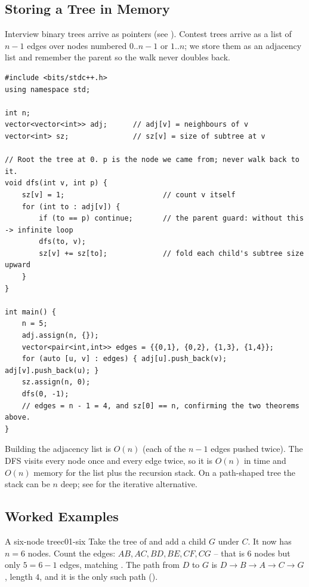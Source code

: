 \subsection{Storing a Tree in Memory}

Interview binary trees arrive as  pointers (see ). Contest
trees arrive as a list of $n-1$ edges over nodes numbered $0..n-1$ or $1..n$; we store
them as an adjacency list and remember the parent so the walk never doubles back.

\begin{lstlisting}[caption={Build an adjacency list from edges and measure sizes with a parent-guard DFS}, label={lst:c01-build}]
#include <bits/stdc++.h>
using namespace std;

int n;
vector<vector<int>> adj;      // adj[v] = neighbours of v
vector<int> sz;               // sz[v] = size of subtree at v

// Root the tree at 0. p is the node we came from; never walk back to it.
void dfs(int v, int p) {
    sz[v] = 1;                       // count v itself
    for (int to : adj[v]) {
        if (to == p) continue;       // the parent guard: without this -> infinite loop
        dfs(to, v);
        sz[v] += sz[to];             // fold each child's subtree size upward
    }
}

int main() {
    n = 5;
    adj.assign(n, {});
    vector<pair<int,int>> edges = {{0,1}, {0,2}, {1,3}, {1,4}};
    for (auto [u, v] : edges) { adj[u].push_back(v); adj[v].push_back(u); }
    sz.assign(n, 0);
    dfs(0, -1);
    // edges = n - 1 = 4, and sz[0] == n, confirming the two theorems above.
}
\end{lstlisting}

\begin{complexitybox}
Building the adjacency list is $O(n)$ (each of the $n-1$ edges pushed twice). The DFS
visits every node once and every edge twice, so it is $O(n)$ in time and $O(n)$ memory
for the list plus the recursion stack. On a path-shaped tree the stack can be $n$ deep;
see  for the iterative alternative.
\end{complexitybox}

\subsection{Worked Examples}

\begin{example}{A six-node tree}{c01-six}
Take the tree of  and add a child $G$ under $C$. It now has $n=6$
nodes. Count the edges: $AB, AC, BD, BE, CF, CG$ -- that is $6$ nodes but only $5=6-1$
edges, matching . The path from $D$ to $G$ is
$D \to B \to A \to C \to G$, length $4$, and it is the only such path
().
\end{example}

